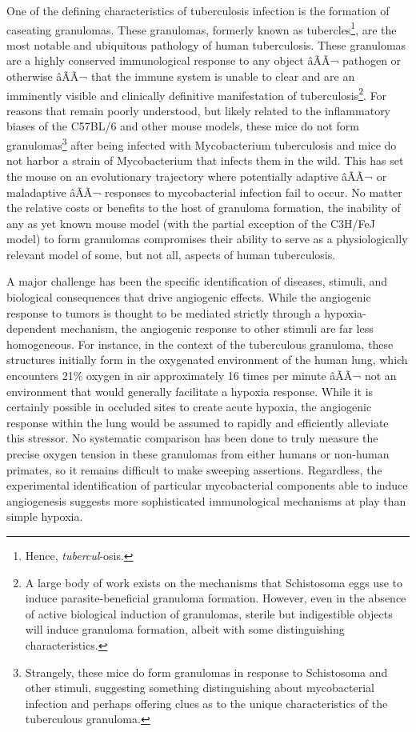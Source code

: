 One of the defining characteristics of tuberculosis infection is the formation of caseating granulomas. These granulomas, formerly known as tubercles\footnote{Hence, \textit{tubercul}-osis.}, are the most notable and ubiquitous pathology of human tuberculosis. These granulomas are a highly conserved immunological response to any object âÃÃ¬ pathogen or otherwise âÃÃ¬ that the immune system is unable to clear and are an imminently visible and clinically definitive manifestation of tuberculosis\footnote{A large body of work exists on the mechanisms that Schistosoma eggs use to induce parasite-beneficial granuloma formation. However, even in the absence of active biological induction of granulomas, sterile but indigestible objects will induce granuloma formation, albeit with some distinguishing characteristics.}. For reasons that remain poorly understood, but likely related to the inflammatory biases of the C57BL/6 and other mouse models, these mice do not form granulomas\footnote{Strangely, these mice do form granulomas in response to Schistosoma and other stimuli, suggesting something distinguishing about mycobacterial infection and perhaps offering clues as to the unique characteristics of the tuberculous granuloma.} after being infected with Mycobacterium tuberculosis and mice do not harbor a strain of Mycobacterium that infects them in the wild. This has set the mouse on an evolutionary trajectory where potentially adaptive âÃÃ¬ or maladaptive âÃÃ¬ responses to mycobacterial infection fail to occur. No matter the relative costs or benefits to the host of granuloma formation, the inability of any as yet known mouse model (with the partial exception of the C3H/FeJ model) to form granulomas compromises their ability to serve as a physiologically relevant model of some, but not all, aspects of human tuberculosis.

A major challenge has been the specific identification of diseases, stimuli, and biological consequences that drive angiogenic effects. While the angiogenic response to tumors is thought to be mediated strictly through a hypoxia-dependent mechanism, the angiogenic response to other stimuli are far less homogeneous. For instance, in the context of the tuberculous granuloma, these structures initially form in the oxygenated environment of the human lung, which encounters 21\% oxygen in air approximately 16 times per minute âÃÃ¬ not an environment that would generally facilitate a hypoxia response. While it is certainly possible in occluded sites to create acute hypoxia, the angiogenic response within the lung would be assumed to rapidly and efficiently alleviate this stressor. No systematic comparison has been done to truly measure the precise oxygen tension in these granulomas from either humans or non-human primates, so it remains difficult to make sweeping assertions. Regardless, the experimental identification of particular mycobacterial components able to induce angiogenesis suggests more sophisticated immunological mechanisms at play than simple hypoxia.

